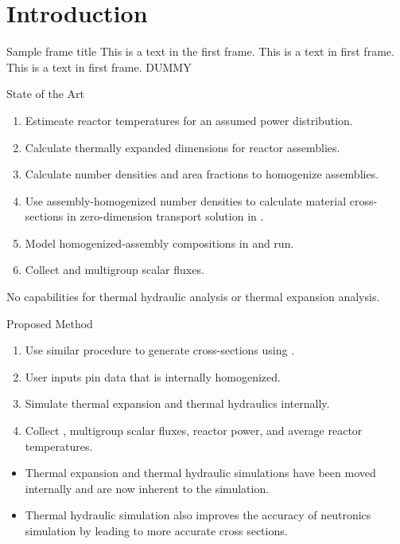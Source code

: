 \section{Introduction}
\label{sec:introduction}

\begin{frame}{Sample frame title}
  This is a text in the first frame. This is a text in first frame. This is a
  text in first frame. DUMMY
\end{frame}

\begin{frame}{State of the Art}

  \begin{enumerate}
    \item Estimeate reactor temperatures for an assumed power distribution.
    \item Calculate thermally expanded dimensions for reactor assemblies.
    \item Calculate number densities and area fractions to homogenize
      assemblies.
    \item Use assembly-homogenized number densities to calculate material
      cross-sections in zero-dimension transport solution in \mcc.
    \item Model homogenized-assembly compositions in \dif and run.
    \item Collect \keff and multigroup scalar fluxes.
  \end{enumerate}

  \begin{block}{}
    No capabilities for thermal hydraulic analysis or thermal expansion
    analysis.
  \end{block}
\end{frame}

\begin{frame}{Proposed Method}
  \begin{enumerate}
    \item Use similar procedure to generate cross-sections using \mcc.
    \item User inputs pin data that is internally homogenized.
    \item Simulate thermal expansion and thermal hydraulics internally.
    \item Collect \keff, multigroup scalar fluxes, reactor power, and average
      reactor temperatures.
  \end{enumerate}
  \begin{itemize}
    \item Thermal expansion and thermal hydraulic simulations have been moved
      internally and are now inherent to the simulation.
    \item Thermal hydraulic simulation also improves the accuracy of neutronics
      simulation by leading to more accurate cross sections.
  \end{itemize}
\end{frame}

